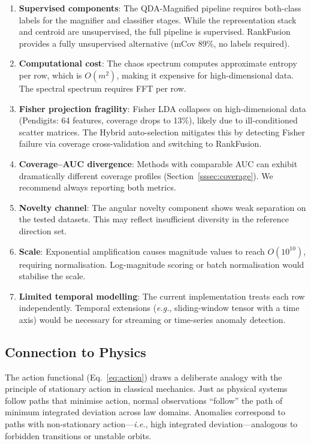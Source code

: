 \documentclass[journal]{IEEEtran}
\newcommand{\ie}{\textit{i.e.}}
\newcommand{\eg}{\textit{e.g.}}
\begin{document}
\begin{enumerate}
  \item \textbf{Supervised components}: The QDA-Magnified pipeline requires both-class labels for the magnifier and classifier stages. While the representation stack and centroid are unsupervised, the full pipeline is supervised. RankFusion provides a fully unsupervised alternative (mCov 89\%, no labels required).
  \item \textbf{Computational cost}: The chaos spectrum computes approximate entropy per row, which is $O(m^2)$, making it expensive for high-dimensional data. The spectral spectrum requires FFT per row.
  \item \textbf{Fisher projection fragility}: Fisher LDA collapses on high-dimensional data (Pendigits: 64 features, coverage drops to 13\%), likely due to ill-conditioned scatter matrices. The Hybrid auto-selection mitigates this by detecting Fisher failure via coverage cross-validation and switching to RankFusion.
  \item \textbf{Coverage--AUC divergence}: Methods with comparable AUC can exhibit dramatically different coverage profiles (Section~\ref{sssec:coverage}). We recommend always reporting both metrics.
  \item \textbf{Novelty channel}: The angular novelty component shows weak separation on the tested datasets. This may reflect insufficient diversity in the reference direction set.
  \item \textbf{Scale}: Exponential amplification causes magnitude values to reach $O(10^{10})$, requiring normalisation. Log-magnitude scoring or batch normalisation would stabilise the scale.
  \item \textbf{Limited temporal modelling}: The current implementation treats each row independently. Temporal extensions (\eg, sliding-window tensor with a time axis) would be necessary for streaming or time-series anomaly detection.
\end{enumerate}

\subsection{Connection to Physics}

The action functional (Eq.~\eqref{eq:action}) draws a deliberate analogy with the principle of stationary action in classical mechanics. Just as physical systems follow paths that minimise action, normal observations ``follow'' the path of minimum integrated deviation across law domains. Anomalies correspond to paths with non-stationary action---\ie, high integrated deviation---analogous to forbidden transitions or unstable orbits.
\end{document}

